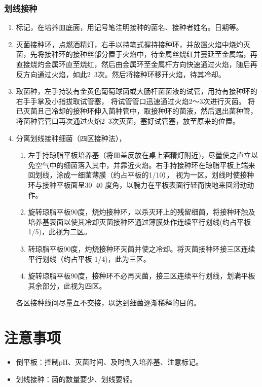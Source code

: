 \documentclass[UTF8]{article}
\begin{document}
    \subsubsection{划线接种}
    \begin{enumerate}
      \item 标记，在培养皿底面，用记号笔注明接种的菌名、接种者姓名。日期等。
      \item 灭菌接种环，点燃酒精灯，右手以持笔式握持接种环，并放置火焰中烧灼灭菌，先将接种环的接种丝部分置于火焰中，待金属丝烧红并蔓延至金属端，再直接烧灼金属环直至烧红，然后由金属环至金属杆方向快速通过火焰，随后再反方向通过火焰，如此2~3次。然后将接种环移开火焰，待其冷却。
      \item 取菌种，左手持装有金黄色葡萄球菌或大肠杆菌菌液的试管，用持有接种环的右手手掌及小指拔取试管塞， 将试管管口迅速通过火焰2～3次进行灭菌。 将已灭菌且己冷却的接种环伸入菌种管中，取接种环的菌液，然后退出菌种管，将菌种管管口再次通过火焰2~3次灭菌，塞好试管塞，放至原来的位置。
      \item {分离划线接种细菌（四区接种法），
      \begin{enumerate}
        \item 左手持琼脂平板培养基（将皿盖反放在桌上酒精灯附近)，尽量使之直立以免空气中的细菌落入其中，并靠近火焰。右手持接种环在琼脂平板上端来回划线，涂成一细菌薄膜（约占平板的1/10）， 视为一区。划线时使接种环与接种平板面呈30~40 度角，以腕力在平板表面行轻而快地来回滑动动作。
        \item 旋转琼脂平板90度，烧灼接种环，以杀灭环上的残留细菌，将接种环触及培养基表面以使其冷却灭菌接种环通过薄膜处作连续平行划线(约占平板 1/5)，此视为二区。
        \item 转琼脂平板90度，灼烧接种环灭菌并使之冷却。将灭菌接种环接三区连续平行划线（约占平板 1/4)，此为三区。
        \item 旋转琼脂平板90度，接种环不必再灭菌，接三区连续平行划线，划满平板其余部分，此视为四区。
      \end{enumerate}
      各区接种线间尽量互不交接，以达到细菌逐渐稀释的目的。
        }
    \end{enumerate}
    \section{注意事项}
    \begin{itemize}
        \item 倒平板：控制pH、灭菌时间、及时倒入培养基、注意标记。
        \item 划线接种：菌的数量要少、划线要轻。
    \end{itemize}
\end{document}
